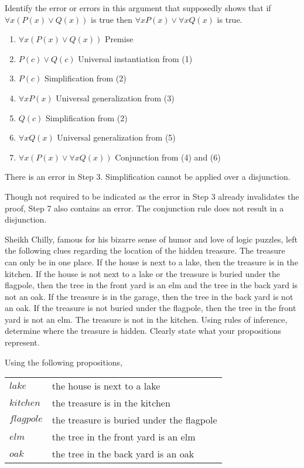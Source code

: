 \documentclass[a4paper]{exam}
\begin{document}
\begin{questions}
  \question  Identify the error or errors in this argument that supposedly shows that if $\forall x(P(x) \lor Q(x))$ is true then $\forall x P(x) \lor \forall x Q(x)$ is true.
\begin{enumerate}
    \item $\forall x(P(x) \lor Q(x))$ \hfill Premise
    \item $P(c) \lor Q(c)$ \hfill Universal instantiation from (1)
    \item $P(c)$ \hfill Simplification from (2)
    \item $\forall x P(x)$ \hfill Universal generalization from (3)
    \item $Q(c)$ \hfill Simplification from (2)
    \item $\forall x Q(x)$ \hfill Universal generalization from (5)
    \item $\forall x(P(x) \lor \forall x Q(x))$ \hfill Conjunction from (4) and (6)
\end{enumerate}
  \begin{solution}
    There is an error in Step 3. Simplification cannot be applied over a disjunction.

    Though not required to be indicated as the error in Step 3 already invalidates the proof, Step 7 also contains an error. The conjunction rule does not result in a disjunction. 
  \end{solution}
  
  \question Sheikh Chilly, famous for his bizarre sense of humor and love of logic puzzles, left the following clues regarding the location of the hidden treasure. The treasure can only be in one place. If the house is next to a lake, then the treasure is in the kitchen. If the house is not next to a lake or the treasure is buried under the flagpole, then the tree in the front yard is an elm and the tree in the back yard is not an oak. If the treasure is in the garage, then the tree in the back yard is not an oak.  If the treasure is not buried under the flagpole, then the tree in the front yard is not an elm. The treasure is not in the kitchen. Using rules of inference, determine where the treasure is hidden. Clearly state what your propositions represent.
  \begin{solution}
    Using the following propositions,\\
    \begin{tabular}{l@{ : }l}
      $lake$ & the house is next to a lake\\
      $kitchen$ & the treasure is in the kitchen\\
      $flagpole$ & the treasure is buried under the flagpole\\
      $elm$ & the tree in the front yard is an elm\\
      $oak$ & the tree in the back yard is an oak
    \end{tabular}
    

\end{solution}
\end{questions}
\end{document}
